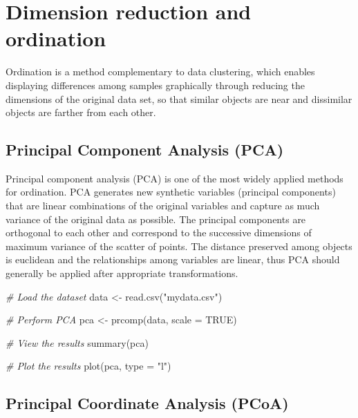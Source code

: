 \documentclass[
]{book}
\newenvironment{Shaded}{\begin{snugshade}}{\end{snugshade}}
\newcommand{\AttributeTok}[1]{\textcolor[rgb]{0.77,0.63,0.00}{#1}}
\newcommand{\CommentTok}[1]{\textcolor[rgb]{0.56,0.35,0.01}{\textit{#1}}}
\newcommand{\ConstantTok}[1]{\textcolor[rgb]{0.00,0.00,0.00}{#1}}
\newcommand{\FunctionTok}[1]{\textcolor[rgb]{0.00,0.00,0.00}{#1}}
\newcommand{\NormalTok}[1]{#1}
\newcommand{\OtherTok}[1]{\textcolor[rgb]{0.56,0.35,0.01}{#1}}
\newcommand{\StringTok}[1]{\textcolor[rgb]{0.31,0.60,0.02}{#1}}
\begin{document}
\hypertarget{dimension-reduction-ordination}{%
\section{Dimension reduction and ordination}\label{dimension-reduction-ordination}}

Ordination is a method complementary to data clustering, which enables displaying differences among samples graphically through reducing the dimensions of the original data set, so that similar objects are near and dissimilar objects are farther from each other.

\hypertarget{pca}{%
\subsection{Principal Component Analysis (PCA)}\label{pca}}

Principal component analysis (PCA) is one of the most widely applied methods for ordination. PCA generates new synthetic variables (principal components) that are linear combinations of the original variables and capture as much variance of the original data as possible. The principal components are orthogonal to each other and correspond to the successive dimensions of maximum variance of the scatter of points. The distance preserved among objects is euclidean and the relationships among variables are linear, thus PCA should generally be applied after appropriate transformations.

\begin{Shaded}
\begin{Highlighting}[]
\CommentTok{\# Load the dataset}
\NormalTok{data }\OtherTok{\textless{}{-}} \FunctionTok{read.csv}\NormalTok{(}\StringTok{"mydata.csv"}\NormalTok{)}

\CommentTok{\# Perform PCA}
\NormalTok{pca }\OtherTok{\textless{}{-}} \FunctionTok{prcomp}\NormalTok{(data, }\AttributeTok{scale =} \ConstantTok{TRUE}\NormalTok{)}

\CommentTok{\# View the results}
\FunctionTok{summary}\NormalTok{(pca)}

\CommentTok{\# Plot the results}
\FunctionTok{plot}\NormalTok{(pca, }\AttributeTok{type =} \StringTok{"l"}\NormalTok{)}
\end{Highlighting}
\end{Shaded}

\hypertarget{pcoa}{%
\subsection{Principal Coordinate Analysis (PCoA)}\label{pcoa}}
\end{document}
